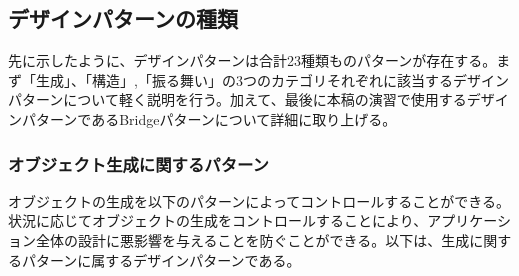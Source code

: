 \documentclass[dvipdfmx]{jsarticle}
\begin{document}
\subsection{デザインパターンの種類}
先に示したように、デザインパターンは合計23種類ものパターンが存在する。まず「生成」、「構造」,「振る舞い」の3つのカテゴリそれぞれに該当するデザインパターンについて軽く説明を行う。加えて、最後に本稿の演習で使用するデザインパターンであるBridgeパターンについて詳細に取り上げる。
\subsubsection{オブジェクト生成に関するパターン}
オブジェクトの生成を以下のパターンによってコントロールすることができる。状況に応じてオブジェクトの生成をコントロールすることにより、アプリケーション全体の設計に悪影響を与えることを防ぐことができる。以下は、生成に関するパターンに属するデザインパターンである。
\end{document}
